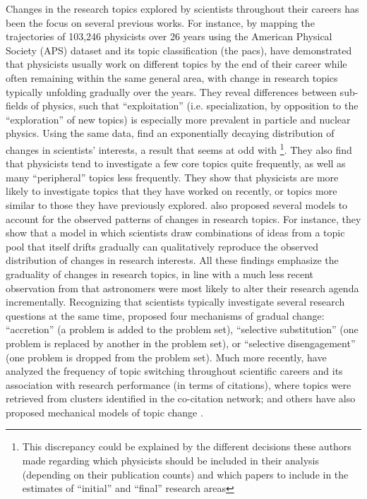 \documentclass{article}
\begin{document}
Changes in the research topics explored by scientists throughout their careers has been the focus on several previous works. For instance, by mapping the trajectories of 103,246 physicists over 26 years using the American Physical Society (APS) dataset and its topic classification (the \gls{pacs}), \citet{Aleta2019} have demonstrated that physicists usually work on different topics by the end of their career while often remaining within the same general area, with change in research topics typically unfolding gradually over the years. They reveal differences between sub-fields of physics, such that ``exploitation'' (i.e. specialization, by opposition to the ``exploration'' of new topics) is especially more prevalent in particle and nuclear physics.  Using the same data, \citet{Jia2017} find an exponentially decaying distribution of changes in scientists' interests, a result that seems at odd with \citealt{Aleta2019}\footnote{This discrepancy could be explained by the different decisions these authors made regarding which physicists should be included in their analysis (depending on their publication counts) and which papers to include in the estimates of ``initial'' and ``final'' research areas}. They also find that physicists tend to investigate a few core topics quite frequently, as well as many ``peripheral'' topics less frequently. They show that physicists are more likely to investigate topics that they have worked on recently, or topics more similar to those they have previously explored. \citet{Jia2017} also proposed several models to account for the observed patterns of changes in research topics. For instance, they show that a model in which scientists draw combinations of ideas from a topic pool that itself drifts gradually can qualitatively reproduce the observed distribution of changes in research interests. All these findings emphasize the graduality of changes in research topics, in line with a much less recent observation from \citet{Gieryn1978} that astronomers were most likely to alter their research agenda incrementally. Recognizing that scientists typically investigate several research questions at the same time, \citeauthor{Gieryn1978} proposed four mechanisms of gradual change: ``accretion'' (a problem is added to the problem set),  ``selective substitution'' (one problem is replaced by another in the problem set), or ``selective disengagement'' (one problem is dropped from the problem set). Much more recently, \citet{Zeng2019} have analyzed the frequency of topic switching throughout scientific careers and its association with research performance (in terms of citations), where topics were retrieved from clusters identified in the co-citation network; and others have also proposed mechanical models of topic change \citep{Chakresh2023,Feifan2023}.
\end{document}
